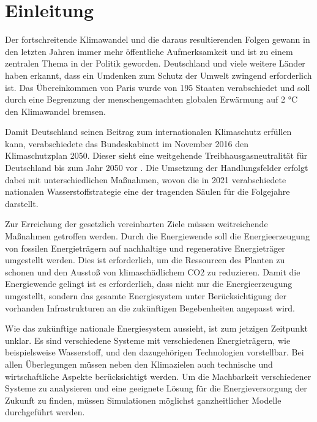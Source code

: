 \section{Einleitung}

Der fortschreitende Klimawandel und die daraus resultierenden Folgen gewann in den letzten Jahren immer mehr öffentliche Aufmerksamkeit und ist zu einem zentralen Thema in der Politik geworden. Deutschland und viele weitere Länder haben erkannt, dass ein Umdenken zum Schutz der Umwelt zwingend erforderlich ist. Das Übereinkommen von Paris wurde von 195 Staaten verabschiedet und soll durch eine Begrenzung der menschengemachten globalen Erwärmung auf 2 °C den Klimawandel bremsen. 

Damit Deutschland seinen Beitrag zum internationalen Klimaschutz erfüllen kann, verabschiedete das Bundeskabinett im November 2016 den Klimaschutzplan 2050. Dieser sieht eine weitgehende Treibhausgasneutralität für Deutschland bis zum Jahr 2050 vor . 
Die Umsetzung der Handlungsfelder erfolgt dabei mit unterschiedlichen Maßnahmen, wovon die in 2021 verabschiedete nationalen Wasserstoffstrategie eine der tragenden Säulen für die Folgejahre darstellt.  

Zur Erreichung der gesetzlich vereinbarten Ziele müssen weitreichende Maßnahmen getroffen werden.
Durch die Energiewende soll die Energieerzeugung von fossilen Energieträgern auf nachhaltige und regenerative Energieträger umgestellt werden.  Dies ist erforderlich, um die Ressourcen des Planten zu schonen und den Ausstoß von klimaschädlichem CO2 zu reduzieren. Damit die Energiewende gelingt ist es erforderlich, dass nicht nur die Energieerzeugung umgestellt, sondern das gesamte Energiesystem unter Berücksichtigung der vorhanden Infrastrukturen an die zukünftigen Begebenheiten angepasst wird.

Wie das zukünftige nationale Energiesystem aussieht, ist zum jetzigen Zeitpunkt unklar. Es sind verschiedene Systeme mit verschiedenen Energieträgern, wie beispielsweise Wasserstoff, und den dazugehörigen Technologien vorstellbar. 
Bei allen Überlegungen müssen neben den Klimazielen auch technische und wirtschaftliche Aspekte berücksichtigt werden. 
Um die Machbarkeit verschiedener Systeme zu analysieren und eine geeignete Lösung für die Energieversorgung der Zukunft zu finden, müssen Simulationen möglichst ganzheitlicher Modelle durchgeführt werden.


